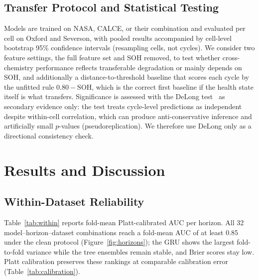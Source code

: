 \documentclass[conference]{IEEEtran}
\begin{document}
\subsection{Transfer Protocol and Statistical Testing}
Models are trained on NASA, CALCE, or their combination and evaluated
per cell on Oxford and Severson, with pooled results accompanied by
cell-level bootstrap 95\% confidence intervals (resampling cells, not
cycles). We consider two feature settings, the full feature set and
SOH removed, to test whether cross-chemistry performance reflects
transferable degradation or mainly depends on SOH, and additionally a
distance-to-threshold baseline that scores each cycle by the unfitted
rule $0.80-\mathrm{SOH}$, which is the correct first baseline if the
health state itself is what transfers. Significance is assessed with
the DeLong test~\cite{delong1988} as secondary evidence only: the test
treats cycle-level predictions as independent despite within-cell
correlation, which can produce anti-conservative inference and
artificially small $p$-values (pseudoreplication). We therefore use
DeLong only as a directional consistency check.

\section{Results and Discussion}

\subsection{Within-Dataset Reliability}
Table~\ref{tab:within} reports fold-mean Platt-calibrated AUC per
horizon. All 32 model--horizon--dataset combinations reach a fold-mean
AUC of at least 0.85 under the clean protocol
(Figure~\ref{fig:horizons}); the GRU shows the largest fold-to-fold
variance while the tree ensembles remain stable, and Brier scores stay
low. Platt calibration preserves these rankings at comparable
calibration error (Table~\ref{tab:calibration}).
\end{document}
